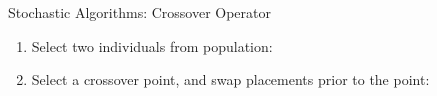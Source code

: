 \documentclass{beamer}
\begin{document}
\begin{frame}[t]{Stochastic Algorithms: Crossover Operator}
    \begin{enumerate}
        \item Select two individuals from population:\par
            \begin{minipage}[t]{\linewidth}
                \centering
            \end{minipage}
        \item Select a crossover point, and swap placements prior to the point: \par
            \begin{minipage}[t]{\linewidth}
                \centering
            \end{minipage}

\end{enumerate}
\end{frame}
\end{document}
